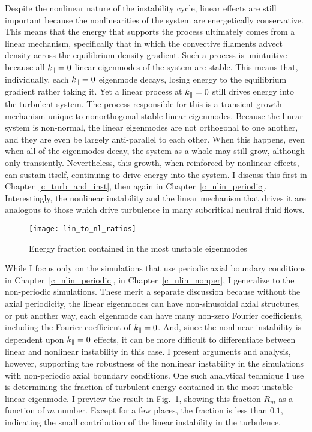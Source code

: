 Despite the nonlinear nature of the instability cycle, linear effects are still important because the nonlinearities of the system are energetically conservative.
This means that the energy that supports the process ultimately comes from a linear mechanism, specifically that in which the convective filaments advect density across the equilibrium density gradient. 
Such a process is unintuitive because all $k_\parallel = 0$ linear eigenmodes of the system are stable. This means that, individually, each $k_\parallel = 0$ eigenmode decays, losing energy to the equilibrium
gradient rather taking it.
Yet a linear process at $k_\parallel = 0$ still drives energy into the turbulent system. The process responsible for this is a transient growth mechanism unique to nonorthogonal
stable linear eigenmodes. Because the linear system is non-normal, the linear eigenmodes are not orthogonal to one another, and they are even be largely anti-parallel to each other.
When this happens, even when all of the eigenmodes decay, the system as a whole may still grow, although only transiently.  Nevertheless, this growth, when reinforced by nonlinear
effects, can sustain itself, continuing to drive energy into the system. I discuss this first in Chapter~\ref{c_turb_and_inst}, then again in
Chapter~\ref{c_nlin_periodic}. Interestingly, the nonlinear instability and the linear mechanism that drives it are analogous to those which drive turbulence
in many subcritical neutral fluid flows.

\begin{figure}
\centerline{\texttt{[image: lin\_to\_nl\_ratios]}}
\caption{Energy fraction contained in the most unstable eigenmodes}
\label{lin_to_nl_ratios_intro}
\end{figure}

While I focus only on the simulations that use periodic axial boundary conditions in Chapter~\ref{c_nlin_periodic}, in Chapter~\ref{c_nlin_nonper}, I generalize to the non-periodic simulations.
These merit a separate discussion because without the axial periodicity, the linear eigenmodes can have non-sinusoidal axial structures, or put another way, each eigenmode can have many non-zero
Fourier coefficients, including the Fourier coefficient of $k_\parallel = 0$. And, since the nonlinear instability is dependent upon $k_\parallel = 0$ effects, 
it can be more difficult to differentiate between linear and nonlinear instability in this case. I present arguments and analysis, however, supporting 
the robustness of the nonlinear instability in the simulations with non-periodic axial boundary conditions. One such analytical technique I use is determining the fraction of turbulent energy
contained in the most unstable linear eigenmode. I preview the result in Fig.~\ref{lin_to_nl_ratios_intro}, showing this fraction $R_m$ as a function of $m$ number. Except for a few places,
the fraction is less than $0.1$, indicating the small contribution of the linear instability in the turbulence.

